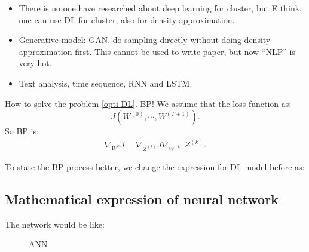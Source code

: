 \begin{itemize}
    \item There is no one have researched about deep learning for cluster, but E think, one can use DL for cluster, also for density approximation.

    \item Generative model: GAN, do sampling directly without doing density approximation first. This cannot be used to write paper, but now ``NLP'' is very hot.

    \item Text analysis, time sequence, RNN and LSTM.

\end{itemize}


How to solve the problem \eqref{opti-DL}. BP! We assume that the loss function as:
$$
J(W^{(0)}, \cdots, W^{(T+1)}).
$$
So BP is:
\begin{align}
    \nabla_{W^{k}} J = \nabla_{Z^{(k)}} J\nabla_{W^{(k)}} Z^{(k)}.
\end{align}

To state the BP process better, we change the expression for DL model before as:

\subsection{Mathematical expression of neural network}
The network would be like:
\begin{figure}[!ht]        
    \caption{ANN}      
\end{figure}

